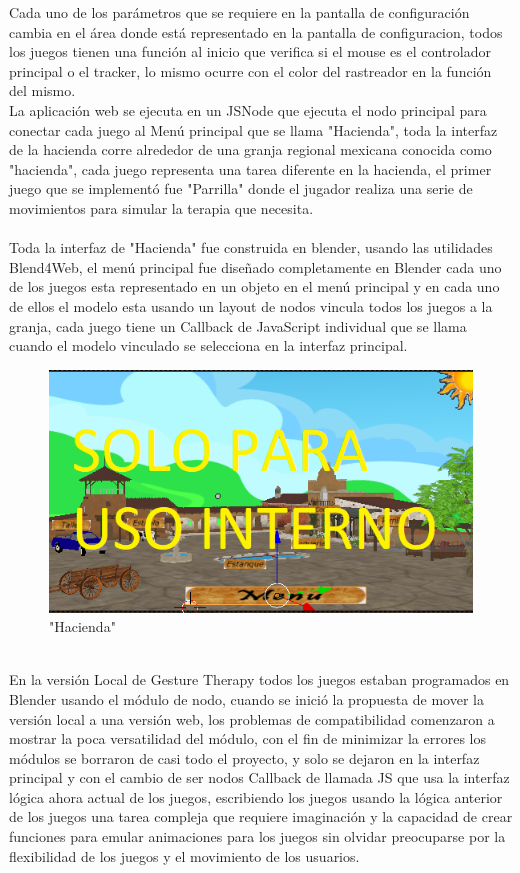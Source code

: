 \documentclass{article}
\begin{document}
Cada uno de los parámetros que se requiere en la pantalla de configuración cambia en el área donde está representado en la pantalla de configuracion, todos los juegos tienen una función al inicio que verifica si el mouse es el controlador principal o el tracker, lo mismo ocurre con el color del rastreador en la función del mismo.
\\
La aplicación web se ejecuta en un JSNode que ejecuta el nodo principal para conectar cada juego al Menú principal que se llama "Hacienda", toda la interfaz de la hacienda corre alrededor de una granja regional mexicana conocida como "hacienda", cada juego representa una tarea diferente en la hacienda, el primer juego que se implementó fue "Parrilla" donde el jugador realiza una serie de movimientos para simular la terapia que necesita. \\
\\
Toda la interfaz de "Hacienda" fue construida en blender, usando las utilidades Blend4Web, el menú principal fue diseñado completamente en Blender cada uno de los juegos esta representado en un objeto en el menú principal y en cada uno de ellos el modelo esta usando un layout de nodos vincula todos los juegos a la granja, cada juego tiene un Callback de JavaScript individual que se llama cuando el modelo vinculado se selecciona en la interfaz principal.
\begin{figure}[h]
    \centering
    \includegraphics[scale=.7]{hacienda.PNG}
    \caption{"Hacienda"}
    \label{Hacienda}
\end{figure}
\\
En la versión Local de Gesture Therapy todos los juegos estaban programados en Blender usando el módulo de nodo, cuando se inició la propuesta de mover la versión local a una versión web, los problemas de compatibilidad comenzaron a mostrar la poca versatilidad del módulo, con el fin de minimizar la errores los módulos se borraron de casi todo el proyecto, y solo se dejaron en la interfaz principal y con el cambio de ser nodos Callback de llamada JS que usa la interfaz lógica ahora actual de los juegos, escribiendo los juegos usando la lógica anterior de los juegos  una tarea compleja que requiere imaginación y la capacidad de crear funciones para emular animaciones para los juegos sin olvidar preocuparse por la flexibilidad de los juegos y el movimiento de los usuarios.
\end{document}
